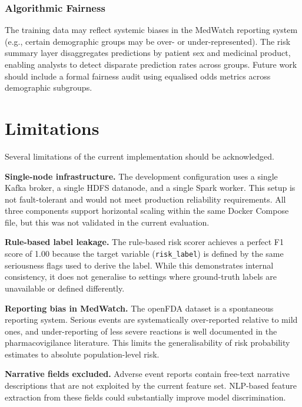 \documentclass[conference]{IEEEtran}
\begin{document}
\subsubsection{Algorithmic Fairness}
The training data may reflect systemic biases in the MedWatch reporting system (e.g., certain demographic groups may be over- or under-represented). The risk summary layer disaggregates predictions by patient sex and medicinal product, enabling analysts to detect disparate prediction rates across groups. Future work should include a formal fairness audit using equalised odds metrics across demographic subgroups.

\section{Limitations}

Several limitations of the current implementation should be acknowledged.

\textbf{Single-node infrastructure.} The development configuration uses a single Kafka broker, a single HDFS datanode, and a single Spark worker. This setup is not fault-tolerant and would not meet production reliability requirements. All three components support horizontal scaling within the same Docker Compose file, but this was not validated in the current evaluation.

\textbf{Rule-based label leakage.} The rule-based risk scorer achieves a perfect F1 score of 1.00 because the target variable (\texttt{risk\_label}) is defined by the same seriousness flags used to derive the label. While this demonstrates internal consistency, it does not generalise to settings where ground-truth labels are unavailable or defined differently.

\textbf{Reporting bias in MedWatch.} The openFDA dataset is a spontaneous reporting system. Serious events are systematically over-reported relative to mild ones, and under-reporting of less severe reactions is well documented in the pharmacovigilance literature. This limits the generalisability of risk probability estimates to absolute population-level risk.

\textbf{Narrative fields excluded.} Adverse event reports contain free-text narrative descriptions that are not exploited by the current feature set. NLP-based feature extraction from these fields could substantially improve model discrimination.
\end{document}
